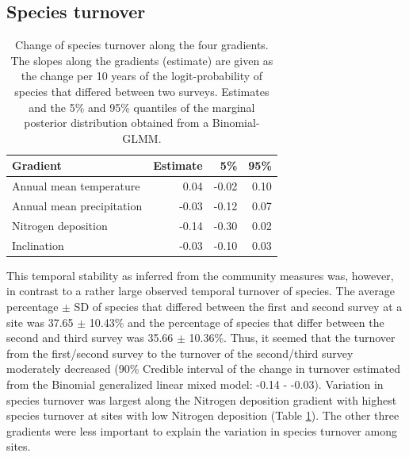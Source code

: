 \documentclass[fleqn,10pt,lineno]{wlpeerj} %
\theoremstyle{definition}
\theoremstyle{definition}
\theoremstyle{definition}
\theoremstyle{remark}
\begin{document}
\subsection*{Species turnover}\label{species-turnover}

\begin{table}

\caption{\label{tab:turnovertab}Change of species turnover along the four gradients. The slopes along the gradients (estimate) are given as the change per 10 years of the logit-probability of species that differed between two surveys. Estimates and the 5\% and 95\% quantiles of the marginal posterior distribution obtained from a Binomial-GLMM.}
\centering
\begin{tabular}[t]{lrrr}
\toprule
Gradient & Estimate & 5\% & 95\%\\
\midrule
Annual mean temperature & 0.04 & -0.02 & 0.10\\
Annual mean precipitation & -0.03 & -0.12 & 0.07\\
Nitrogen deposition & -0.14 & -0.30 & 0.02\\
Inclination & -0.03 & -0.10 & 0.03\\
\bottomrule
\end{tabular}
\end{table}

This temporal stability as inferred from the community measures was,
however, in contrast to a rather large observed temporal turnover of
species. The average percentage \(\pm\) SD of species that differed
between the first and second survey at a site was 37.65 \(\pm\) 10.43\%
and the percentage of species that differ between the second and third
survey was 35.66 \(\pm\) 10.36\%. Thus, it seemed that the turnover from
the first/second survey to the turnover of the second/third survey
moderately decreased (90\% Credible interval of the change in turnover
estimated from the Binomial generalized linear mixed model: -0.14 -
-0.03). Variation in species turnover was largest along the Nitrogen
deposition gradient with highest species turnover at sites with low
Nitrogen deposition (Table \ref{tab:turnovertab}). The other three
gradients were less important to explain the variation in species
turnover among sites.
\end{document}
